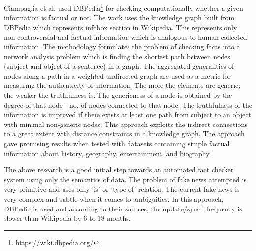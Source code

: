 \documentclass[a4paper, 11pt]{article}
\begin{document}
Ciampaglia et al. \cite{Ciampaglia2015} used DBPedia\footnote{https://wiki.dbpedia.org/} for checking computationally whether a given information is factual or not. The work uses the knowledge graph built from DBPedia which represents infobox section in Wikipedia. This represents only non-controversial and factual information which is analogous to human collected information. The methodology formulates the problem of checking facts into a network analysis problem which is finding the shortest path between nodes (subject and object of a sentence) in a graph. The aggregated generalities of nodes along a path in a weighted undirected graph are used as a metric for measuring the authenticity of information. The more the elements are generic; the weaker the truthfulness is.  The genericness of a node is obtained by the degree of that node - no. of nodes connected to that node. The truthfulness of the information is improved if there exists at least one path from subject to an object with minimal non-generic nodes. This approach exploits the indirect connections to a great extent with distance constraints in a knowledge graph. The approach gave promising results when tested with datasets containing simple factual information about history, geography, entertainment, and biography. 

The above research is a good initial step towards an automated fact checker system using only the semantics of data. The problem of fake news attempted is very primitive and uses only 'is' or 'type of' relation. The current fake news is very complex and subtle when it comes to ambiguities. In this approach, DBPedia is used and according to their sources, the update/synch frequency is slower than Wikipedia by 6 to 18 months.






\end{document}
